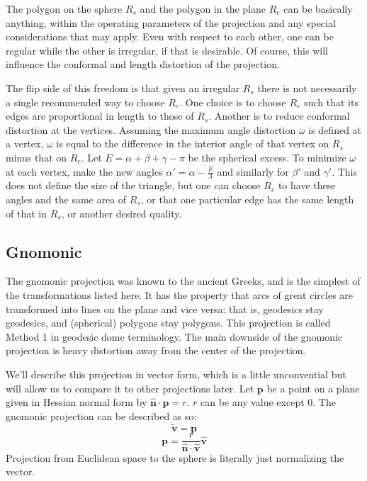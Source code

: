 \documentclass{amsart}[12pt]
\begin{document}
The polygon on the sphere $R_s$ and the polygon in the plane $R_e$ can be
basically anything, within the operating parameters of the projection and any
special considerations that may apply. Even with respect to each other, one
can be regular while the other is irregular, if that is desirable. Of course,
this will influence the conformal and length distortion of the projection.

The flip side of this freedom is that given an irregular $R_s$ there is not
necessarily a single recommended way to choose $R_e$. One choice is to choose
$R_e$ such that its edges are proportional in length to those of $R_s$. Another
is to reduce conformal distortion at the vertices. Assuming the maximum angle
distortion $\omega$ is defined at a vertex, $\omega$ is equal to the difference
in the interior angle of that vertex on $R_s$ minus that on $R_e$. Let
$E = \alpha + \beta + \gamma - \pi$ be the spherical excess. To minimize
$\omega$ at each vertex, make the new angles $\alpha' = \alpha - \frac{E}{3}$
and similarly for $\beta'$ and $\gamma'$. This does not define the size of the
triangle, but one can choose $R_e$ to have these angles and the same area of
$R_s$, or that one particular edge has the same length of that in $R_s$, or
another desired quality.

\subsection{Gnomonic}
The gnomonic projection was known to the ancient Greeks, and is the simplest
of the transformations listed here.\cite{snyder87} It has the property that
arcs of great circles are transformed into lines on the plane and vice versa:
that is, geodesics stay geodesics, and (spherical) polygons stay polygons. This
projection is called Method 1 in geodesic dome terminology.\cite{kenner} The
main downside of the gnomonic projection is heavy distortion away from the
center of the projection.

We'll describe this projection in vector form, which is a little unconvential
but will allow us to compare it to other projections later.
Let $\mathbf p$ be a point on a plane given in Hessian normal form by
$\hat{\mathbf n} \cdot \mathbf p = r$. $r$ can be any value except 0.
The gnomonic projection can be described as so:
\begin{equation}
  \widetilde{\mathbf v} = \mathbf p
\end{equation}
\begin{equation}
\mathbf p = \frac{r}
  {\hat{\mathbf n} \cdot \hat{\mathbf v}}\hat{\mathbf v}
\end{equation}
Projection from Euclidean space to the sphere is literally just
normalizing the vector.
\end{document}
